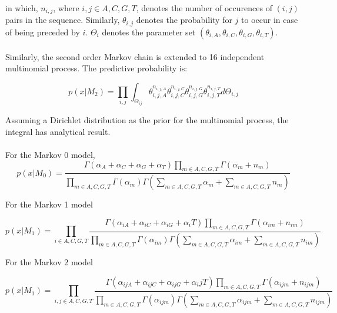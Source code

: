 \documentclass[paper=a4, fontsize=11pt]{scrartcl} %
\numberwithin{equation}{section} %
\numberwithin{figure}{section} %
\numberwithin{table}{section} %
\begin{document}
in which, $n_{i,j}$, where $i,j \in {A,C,G,T}$, denotes the number of occurences of $(i,j)$ pairs in the sequence. Similarly, $\theta_{i,j}$ denotes the probability for $j$ to occur in case of being preceded by $i$. $\Theta_i$ denotes the parameter set $(\theta_{i,A}, \theta_{i,C}, \theta_{i,G}, \theta_{i,T})$.
\\\\
Similarly, the second order Markov chain is extended to 16 independent multinomial process. The predictive probability is:

\begin {equation}
  p (x| M_2) = \prod_{i,j} \int_{\Theta_{ij}} \theta_{i,j,A}^{n_{i,j,A}} \theta_{i,j,C}^{n_{i,j,C}} \theta_{i,j,G}^{n_{i,j,G}} \theta_{i,j,T}^{n_{i,j,T}} d\Theta_{i,j} 
\end {equation}  

Assuming a Dirichlet distribution as the prior for the multinomial process, the integral has analytical result. 
\\\\
For the Markov 0 model, 
\begin {equation}
p (x| M_0) = \frac{\Gamma (\alpha_A + \alpha_C + \alpha_G + \alpha_T) \prod\limits_{m \in {A,C,G,T}} \Gamma (\alpha_m + n_m)} {\prod\limits_{m \in {A,C,G,T}} \Gamma (\alpha_m) \Gamma (\sum\limits_{m \in {A,C,G,T}}\alpha_m + \sum\limits_{m \in {A,C,G,T}}n_m)}
\end {equation}  

For the Markov 1 model

\begin {equation}
p (x| M_1) = \prod\limits_{i \in {A,C,G,T}} \frac{\Gamma (\alpha_{iA} + \alpha_{iC} + \alpha_{iG} + \alpha_iT) \prod\limits_{m \in {A,C,G,T}} \Gamma (\alpha_{im} + n_{im})} {\prod\limits_{m \in {A,C,G,T}} \Gamma (\alpha_{im}) \Gamma (\sum\limits_{m \in {A,C,G,T}}\alpha_{im} + \sum\limits_{m \in {A,C,G,T}}n_{im})}
\end {equation}  

For the Markov 2 model

\begin {equation}
p (x| M_1) = \prod\limits_{i,j \in {A,C,G,T}} \frac{\Gamma (\alpha_{ijA} + \alpha_{ijC} + \alpha_{ijG} + \alpha_ijT) \prod\limits_{m \in {A,C,G,T}} \Gamma (\alpha_{ijm} + n_{ijm})} {\prod\limits_{m \in {A,C,G,T}} \Gamma (\alpha_{ijm}) \Gamma (\sum\limits_{m \in {A,C,G,T}}\alpha_{ijm} + \sum\limits_{m \in {A,C,G,T}}n_{ijm})}
\end {equation}  
\end{document}
